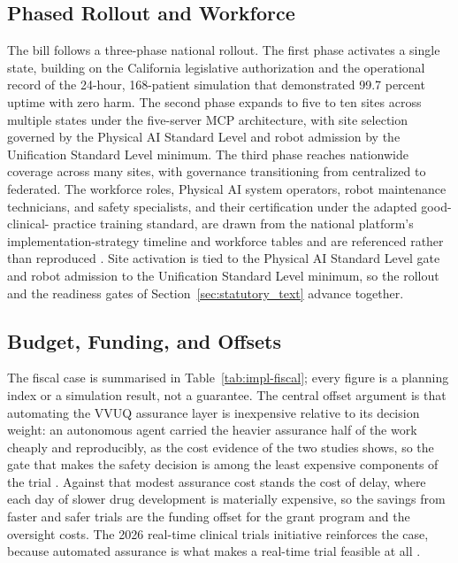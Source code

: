\subsection{Phased Rollout and Workforce}

The bill follows a three-phase national rollout. The first phase activates a
single state, building on the California legislative authorization and the
operational record of the 24-hour, 168-patient simulation that demonstrated 99.7
percent uptime with zero harm. The second phase expands to five to ten sites
across multiple states under the five-server MCP architecture, with site
selection governed by the Physical AI Standard Level and robot admission by the
Unification Standard Level minimum. The third phase reaches nationwide coverage
across many sites, with governance transitioning from centralized to federated.
The workforce roles, Physical AI system operators, robot maintenance technicians,
and safety specialists, and their certification under the adapted good-clinical-
practice training standard, are drawn from the national platform's
implementation-strategy timeline and workforce tables and are referenced rather
than reproduced \cite{kawchak2026national, kawchak2026sitedocs}. Site activation
is tied to the Physical AI Standard Level gate and robot admission to the
Unification Standard Level minimum, so the rollout and the readiness gates of
Section~\ref{sec:statutory_text} advance together.

\subsection{Budget, Funding, and Offsets}

The fiscal case is summarised in Table~\ref{tab:impl-fiscal}; every figure is a
planning index or a simulation result, not a guarantee. The central offset
argument is that automating the VVUQ assurance layer is inexpensive relative to
its decision weight: an autonomous agent carried the heavier assurance half of
the work cheaply and reproducibly, as the cost evidence of the two studies shows,
so the gate that makes the safety decision is among the least expensive
components of the trial \cite{kawchak2026vvuq01, kawchak2026vvuq02}. Against that
modest assurance cost stands the cost of delay, where each day of slower drug
development is materially expensive, so the savings from faster and safer trials
are the funding offset for the grant program and the oversight costs. The 2026
real-time clinical trials initiative reinforces the case, because automated
assurance is what makes a real-time trial feasible at all \cite{fda2026realtime}.

